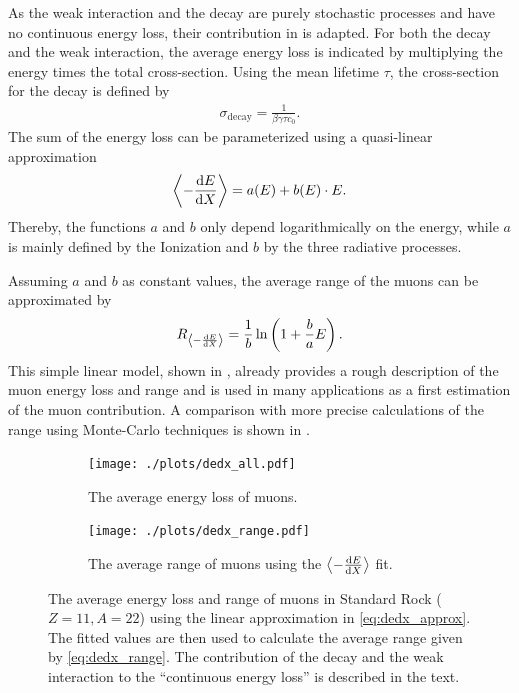 As the weak interaction and the decay are purely stochastic processes and have no continuous energy loss, their contribution in  is adapted.
For both the decay and the weak interaction, the average energy loss is indicated by multiplying the energy times the total cross-section.
Using the mean lifetime $\tau$, the cross-section for the decay is defined by
\begin{align} \label{eq:sigma_decay}
    \sigma_{\text{decay}} = \frac{1}{\beta \gamma \tau c_0}.
\end{align}
The sum of the energy loss can be parameterized using a quasi-linear approximation
\begin{align} \label{eq:dedx_approx}
    \left\langle - \frac{\mathrm{d} E}{\mathrm{d} X} \right\rangle = a(E) + b(E) \cdot E.
\end{align}
Thereby, the functions $a$ and $b$ only depend logarithmically on the energy, while $a$ is mainly defined by the Ionization and $b$ by the three radiative processes.

Assuming $a$ and $b$ as constant values, the average range of the muons can be approximated by
\begin{align} \label{eq:dedx_range}
    R_{\left\langle -\frac{\mathrm{d} E}{\mathrm{d} X} \right\rangle} = \frac{1}{b} \operatorname{ln} \left( 1 + \frac{b}{a} E \right).
\end{align}
This simple linear model, shown in , already provides a rough description of the muon energy loss and range and is used in many applications as a first estimation of the muon contribution.
A comparison with more precise calculations of the range using Monte-Carlo techniques is shown in .
\begin{figure}
    \centering
    \begin{subfigure}{0.9\textwidth}
        \centering
        \texttt{[image: ./plots/dedx\_all.pdf]}
        \caption{The average energy loss of muons.}
        \label{fig:dedx_all}
        \vspace{0.5cm}
    \end{subfigure}
    \begin{subfigure}{0.9\textwidth}
        \centering
        \texttt{[image: ./plots/dedx\_range.pdf]}
        \caption{The average range of muons using the $\left\langle -\frac{\mathrm{d} E}{\mathrm{d} X} \right\rangle$ fit.}
        \label{fig:dedx_range}
    \end{subfigure}
    \caption{The average energy loss and range of muons in Standard Rock ($Z=11, A=22$) using the linear approximation in \ref{eq:dedx_approx}. The fitted values are then used to calculate the average range given by \ref{eq:dedx_range}. The contribution of the decay and the weak interaction to the \enquote{continuous energy loss} is described in the text.}
    \label{fig:dedx}
\end{figure}

